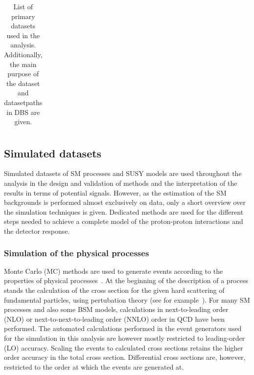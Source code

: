 \begin{table}
\begin{center}
\begin{tabular}{c|c|c}
\end{tabular}


\caption{List of primary datasets used in the analysis. Additionally, the main purpose of the dataset and datasetpaths in DBS are given.}
\label{tab:datasets}
\end{center}
\end{table}



\subsection{Simulated datasets}
\label{sec:MCGen}
Simulated datasets of SM processes and SUSY models are used throughout the analysis in the design and validation of methods and the interpretation of the results in terms of potential signals. However, as the estimation of the SM backgrounds is performed almost exclusively on data, only a short overview over the simulation techniques is given. Dedicated methods are used for the different steps needed to achieve a complete model of the proton-proton interactions and the detector response. 
\subsubsection{Simulation of the physical processes}
Monte Carlo (MC) methods are used to generate events according to the properties of physical processes~\cite{PDG}.
At the beginning of the description of a process stands the calculation of the cross section for the given hard scattering of fundamental particles, using pertubation theory (see for example~\cite{HalzenMartin}). For many SM processes and also some BSM models, calculations in next-to-leading order (NLO) or next-to-next-to-leading order (NNLO) order in QCD have been performed. The automated calculations performed in the event generators used for the simulation in this analysis are however mostly restricted to leading-order (LO) accuracy. Scaling the events to calculated cross sections retains the higher order accuracy in the total cross section. Differential cross sections are, however, restricted to the order at which the events are generated at.  

